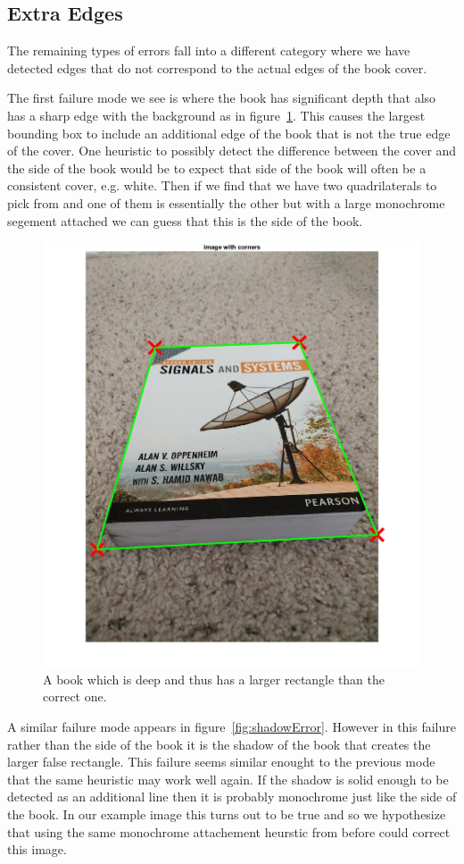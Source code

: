 \subsection{Extra Edges}
The remaining types of errors fall into a different category where we have detected edges that do not correspond to the actual edges of the book cover.

The first failure mode we see is where the book has significant depth that also has a sharp edge with the background as in figure~\ref{fig:depthError}.
This causes the largest bounding box to include an additional edge of the book that is not the true edge of the cover.
One heuristic to possibly detect the difference between the cover and the side of the book would be to expect that side of the book will often be a consistent cover, e.g. white.
Then if we find that we have two quadrilaterals to pick from and one of them is essentially the other but with a large monochrome segement attached we can guess that this is the side of the book.


\begin{figure}[t]
\begin{center}
   \includegraphics[width=0.8\linewidth]{figures/depthError.jpg}
\end{center}
\caption{A book which is deep and thus has a larger rectangle than the correct one.}
\label{fig:depthError}
\end{figure}

A similar failure mode appears in figure~\ref{fig:shadowError}.
However in this failure rather than the side of the book it is the shadow of the book that creates the larger false rectangle.
This failure seems similar enought to the previous mode that the same heuristic may work well again.
If the shadow is solid enough to be detected as an additional line then it is probably monochrome just like the side of the book.
In our example image this turns out to be true and so we hypothesize that using the same monochrome attachement heurstic from before could correct this image.

